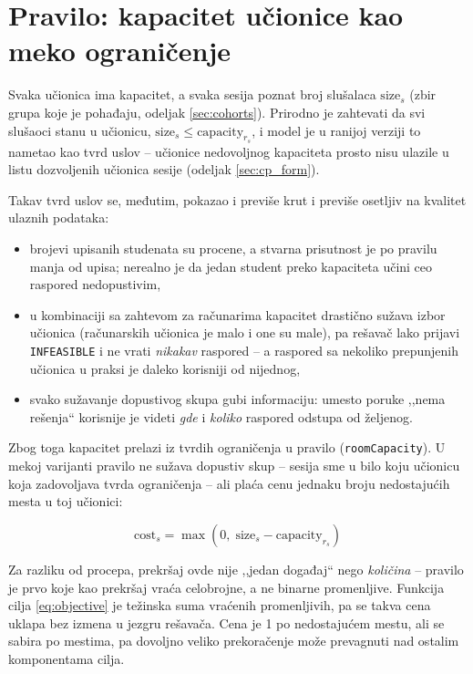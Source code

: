 \documentclass[12pt,oneside]{memoir}
\begin{document}
\section{Pravilo: kapacitet učionice kao meko ograničenje}
\label{sec:kapacitet}

Svaka učionica ima kapacitet, a svaka sesija poznat broj slušalaca
$\text{size}_s$ (zbir grupa koje je pohađaju, odeljak
\ref{sec:cohorts}). Prirodno je zahtevati da svi slušaoci stanu u
učionicu, $\text{size}_s \leq \text{capacity}_{r_s}$, i model je u
ranijoj verziji to nametao kao tvrd uslov -- učionice nedovoljnog
kapaciteta prosto nisu ulazile u listu dozvoljenih učionica sesije
(odeljak \ref{sec:cp_form}).

Takav tvrd uslov se, međutim, pokazao i previše krut i previše
osetljiv na kvalitet ulaznih podataka:

\begin{itemize}
\item brojevi upisanih studenata su procene, a stvarna prisutnost je
  po pravilu manja od upisa; nerealno je da jedan student preko
  kapaciteta učini ceo raspored nedopustivim,
\item u kombinaciji sa zahtevom za računarima kapacitet drastično sužava
  izbor učionica (računarskih učionica je malo i one su male), pa
  rešavač lako prijavi \texttt{INFEASIBLE} i ne vrati \emph{nikakav}
  raspored -- a raspored sa nekoliko prepunjenih učionica u praksi je
  daleko korisniji od nijednog,
\item svako sužavanje dopustivog skupa gubi informaciju: umesto poruke
  ,,nema rešenja`` korisnije je videti \emph{gde} i \emph{koliko}
  raspored odstupa od željenog.
\end{itemize}

Zbog toga kapacitet prelazi iz tvrdih ograničenja u pravilo
 (\texttt{roomCapacity}). U mekoj varijanti
pravilo ne sužava dopustiv skup -- sesija sme u bilo koju učionicu koja
zadovoljava tvrda ograničenja -- ali plaća cenu jednaku broju
nedostajućih mesta u toj učionici:

\begin{equation}
\text{cost}_s = \max
  \left( 0,\; \text{size}_s - \text{capacity}_{r_s} \right)
\label{eq:room_cost}
\end{equation}

Za razliku od procepa, prekršaj ovde nije ,,jedan događaj`` nego
\emph{količina} -- pravilo je prvo koje kao prekršaj vraća celobrojne, a
ne binarne promenljive. Funkcija cilja \eqref{eq:objective} je težinska
suma vraćenih promenljivih, pa se takva cena uklapa bez izmena u jezgru
rešavača. Cena je 1 po nedostajućem mestu, ali se sabira po mestima, pa
dovoljno veliko prekoračenje može prevagnuti nad ostalim komponentama
cilja.
\end{document}

